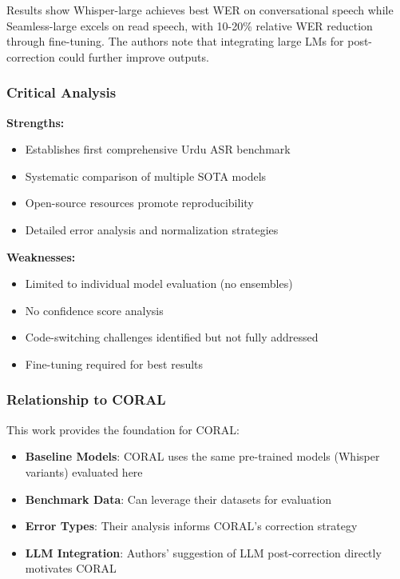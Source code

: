 Results show Whisper-large achieves best WER on conversational speech while Seamless-large excels on read speech, with 10-20\% relative WER reduction through fine-tuning. The authors note that integrating large LMs for post-correction could further improve outputs.

\subsubsection{Critical Analysis}

\textbf{Strengths:}
\begin{itemize}[topsep=4pt,itemsep=2pt]
    \item Establishes first comprehensive Urdu ASR benchmark
    \item Systematic comparison of multiple SOTA models
    \item Open-source resources promote reproducibility
    \item Detailed error analysis and normalization strategies
\end{itemize}

\textbf{Weaknesses:}
\begin{itemize}[topsep=4pt,itemsep=2pt]
    \item Limited to individual model evaluation (no ensembles)
    \item No confidence score analysis
    \item Code-switching challenges identified but not fully addressed
    \item Fine-tuning required for best results
\end{itemize}

\subsubsection{Relationship to CORAL}

This work provides the foundation for CORAL:

\begin{itemize}[topsep=4pt,itemsep=2pt]
    \item \textbf{Baseline Models}: CORAL uses the same pre-trained models (Whisper variants) evaluated here
    \item \textbf{Benchmark Data}: Can leverage their datasets for evaluation
    \item \textbf{Error Types}: Their analysis informs CORAL's correction strategy
    \item \textbf{LLM Integration}: Authors' suggestion of LLM post-correction directly motivates CORAL
\end{itemize}

